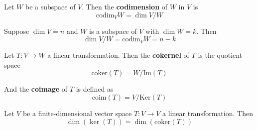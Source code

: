 \begin{definition}[Codimension]
	Let $W$ be a subspace of $V$. Then the \textbf{codimension} of $W$ in $V$ is
	\[
		\text{codim}_V W = \dim V/W
	\]
\end{definition}

\begin{theorem}
	Suppose $\dim V = n$ and $W$ is a subspace of $V$ with $\dim W = k$. Then 
	\[
		\dim V/W = \text{codim}_V W = n-k
	\]
\end{theorem}

\begin{definition}
	Let $T : V \longrightarrow W$ a linear transformation. Then the \textbf{cokernel} of $T$ is the quotient space
	\[
		\text{coker} (T) = W / \text{Im}(T)
	\] 

	And the \textbf{coimage} of $T$ is defined as
	\[
		\text{coim} (T) = V / \text{Ker}(T)
	\]
\end{definition}

\begin{corollary}
	Let $V$ be a finite-dimensional vector space $T : V \longrightarrow V$ a linear transformation. Then 
	\[
		\dim (\ker (T)) = \dim (\text{coker} (T))
	\]
\end{corollary}